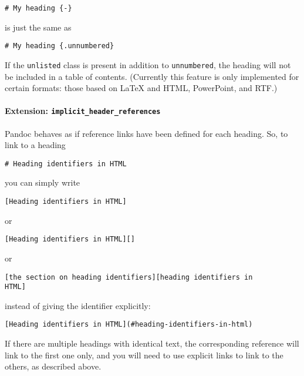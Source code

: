 \documentclass[]{article}
\begin{document}
\begin{verbatim}
# My heading {-}
\end{verbatim}

is just the same as

\begin{verbatim}
# My heading {.unnumbered}
\end{verbatim}

If the \texttt{unlisted} class is present in addition to
\texttt{unnumbered}, the heading will not be included in a table of
contents. (Currently this feature is only implemented for certain
formats: those based on LaTeX and HTML, PowerPoint, and RTF.)

\hypertarget{extension-implicit_header_references}{%
\paragraph{\texorpdfstring{Extension:
\texttt{implicit\_header\_references}}{Extension: implicit\_header\_references}}\label{extension-implicit_header_references}}

Pandoc behaves as if reference links have been defined for each heading.
So, to link to a heading

\begin{verbatim}
# Heading identifiers in HTML
\end{verbatim}

you can simply write

\begin{verbatim}
[Heading identifiers in HTML]
\end{verbatim}

or

\begin{verbatim}
[Heading identifiers in HTML][]
\end{verbatim}

or

\begin{verbatim}
[the section on heading identifiers][heading identifiers in
HTML]
\end{verbatim}

instead of giving the identifier explicitly:

\begin{verbatim}
[Heading identifiers in HTML](#heading-identifiers-in-html)
\end{verbatim}

If there are multiple headings with identical text, the corresponding
reference will link to the first one only, and you will need to use
explicit links to link to the others, as described above.
\end{document}
